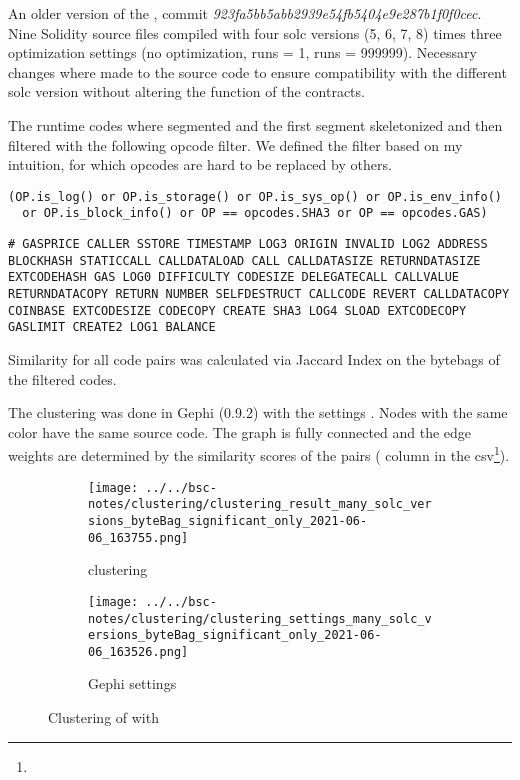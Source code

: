 \documentclass[../main.tex]{subfiles}
\begin{document}
An older version of the , commit \textit{923fa5bb5abb2939e54fb5404e9e287b1f0f0cec}.
Nine Solidity source files compiled with four solc versions (5, 6, 7, 8) times three optimization
settings (no optimization, runs = 1, runs = 999999).
Necessary changes where made to the source code to ensure compatibility with the different solc
version without altering the function of the contracts.

The runtime codes where segmented and the first segment skeletonized and then filtered with the following opcode filter. We defined the filter based on my intuition, for which opcodes are hard to be replaced by others.
\begin{lstlisting}[style=pymd]
(OP.is_log() or OP.is_storage() or OP.is_sys_op() or OP.is_env_info()
  or OP.is_block_info() or OP == opcodes.SHA3 or OP == opcodes.GAS)
\end{lstlisting}
\begin{lstlisting}[style=pysm]
# GASPRICE CALLER SSTORE TIMESTAMP LOG3 ORIGIN INVALID LOG2 ADDRESS BLOCKHASH STATICCALL CALLDATALOAD CALL CALLDATASIZE RETURNDATASIZE EXTCODEHASH GAS LOG0 DIFFICULTY CODESIZE DELEGATECALL CALLVALUE RETURNDATACOPY RETURN NUMBER SELFDESTRUCT CALLCODE REVERT CALLDATACOPY COINBASE EXTCODESIZE CODECOPY CREATE SHA3 LOG4 SLOAD EXTCODECOPY GASLIMIT CREATE2 LOG1 BALANCE
\end{lstlisting}

Similarity for all code pairs was calculated via Jaccard Index on the bytebags of the filtered codes.

The clustering  was done in Gephi (0.9.2) with the settings .
Nodes with the same color have the same source code.
The graph is fully connected and the edge weights are determined by the similarity scores of the pairs ( column in the csv\footnote{}).

\begin{figure}[ht!]
  \begin{subfigure}[c]{.6\linewidth}
    \texttt{[image: ../../bsc-notes/clustering/clustering\_result\_many\_solc\_versions\_byteBag\_significant\_only\_2021-06-06\_163755.png]}
    \caption{clustering}
    \label{fig:solc_bytebag_cluster}
  \end{subfigure}%
  \begin{subfigure}[c]{.4\linewidth}
    \texttt{[image: ../../bsc-notes/clustering/clustering\_settings\_many\_solc\_versions\_byteBag\_significant\_only\_2021-06-06\_163526.png]}
    \caption{Gephi settings}
    \label{fig:solc_bytebag_cluster_settings}
  \end{subfigure}
  \caption{Clustering of \n{\solcts} with }
\end{figure}
\end{document}
